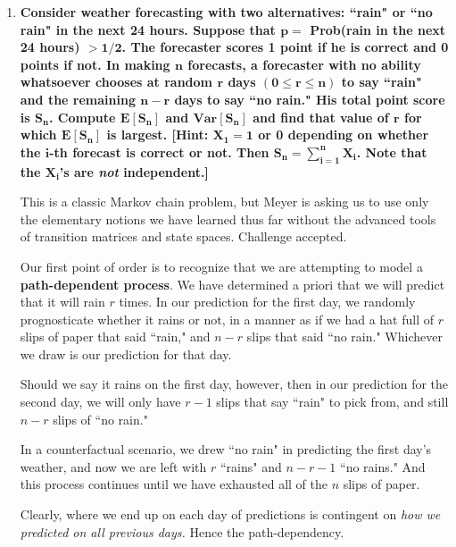\documentclass[10pt, oneside]{article}
\begin{document}
\begin{enumerate}[label=7.\arabic*]
\begin{enumerate}
	  
	  
	\end{enumerate}

\newpage
\item  \begin{tcolorbox}[
  colback=Cerulean!5!white,
  colframe=Cerulean!75!black]
\textbf{Consider weather forecasting with two alternatives: ``rain" or ``no rain" in the next 24 hours. Suppose that $\bm{p = }$ Prob(rain in the next 24 hours) $\bm{> 1/2}$. The forecaster scores 1 point if he is correct and 0 points if not. In making $\bm{n}$ forecasts, a forecaster with no ability whatsoever chooses at random $\bm{r}$ days $\bm{(0 \leq r \leq n)}$ to say ``rain" and the remaining $\bm{n-r}$ days to say ``no rain." His total point score is $\bm{S_n}$. Compute $\bm{E[S_n]}$ and $\bm{Var[S_n]}$ and find that value of $\bm{r}$ for which $\bm{E[S_n]}$ is largest. [Hint: $\bm{X_1 = 1}$ or 0 depending on whether the $\bm{i}$-th forecast is correct or not. Then $\bm{S_n = \sum^n_{i=1} X_i}$. Note that the $\bm{X_i}$'s are \textit{not} independent.] }
\end{tcolorbox}

This is a classic Markov chain problem, but Meyer is asking us to use only the elementary notions we have learned thus far without the advanced tools of transition matrices and state spaces. Challenge accepted.

Our first point of order is to recognize that we are attempting to model a \textbf{path-dependent process}. We have determined a priori that we will predict that it will rain $r$ times. In our prediction for the first day, we randomly prognosticate whether it rains or not, in a manner as if we had a hat full of $r$ slips of paper that said ``rain," and $n-r$ slips that said ``no rain." Whichever we draw is our prediction for that day. 

Should we say it rains on the first day, however, then in our prediction for the second day, we will only have $r-1$ slips that say ``rain" to pick from, and still $n-r$ slips of ``no rain." 

In a counterfactual scenario, we drew ``no rain" in predicting the first day's weather, and now we are left with $r$ ``rains" and $n-r-1$ ``no rains." And this process continues until we have exhausted all of the $n$ slips of paper. 

Clearly, where we end up on each day of predictions is contingent on \textit{how we predicted on all previous days.} Hence the path-dependency.

\end{enumerate}
\end{document}

